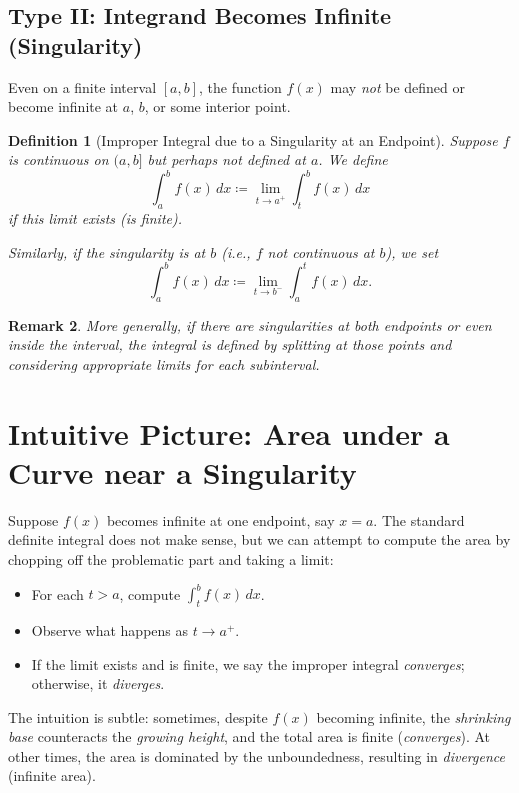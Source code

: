\documentclass[12pt]{article}
\newtheorem{definition}{Definition}[section]
\newtheorem{remark}[definition]{Remark}
\begin{document}
\subsection{Type II: Integrand Becomes Infinite (Singularity)}
Even on a finite interval $[a,b]$, the function $f(x)$ may \emph{not} be defined or become infinite at $a$, $b$, or some interior point.

\begin{definition}[Improper Integral due to a Singularity at an Endpoint]
Suppose $f$ is continuous on $(a,b]$ but perhaps not defined at $a$. We define
\[
\int_a^b f(x)\,dx \coloneqq \lim_{t\to a^+} \int_t^b f(x)\,dx
\]
if this limit exists (is finite).

Similarly, if the singularity is at $b$ (i.e., $f$ not continuous at $b$), we set
\[
\int_a^b f(x)\,dx \coloneqq \lim_{t\to b^-} \int_a^t f(x)\,dx.
\]
\end{definition}

\begin{remark}
More generally, if there are singularities at both endpoints or even inside the interval, the integral is defined by splitting at those points and considering appropriate limits for each subinterval.
\end{remark}

\section{Intuitive Picture: Area under a Curve near a Singularity}

Suppose $f(x)$ becomes infinite at one endpoint, say $x=a$. The standard definite integral does not make sense, but we can attempt to compute the area by chopping off the problematic part and taking a limit:

\begin{itemize}
    \item For each $t > a$, compute $\int_t^b f(x)\,dx$.
    \item Observe what happens as $t\to a^+$.
    \item If the limit exists and is finite, we say the improper integral \emph{converges}; otherwise, it \emph{diverges}.
\end{itemize}

The intuition is subtle: sometimes, despite $f(x)$ becoming infinite, the \emph{shrinking base} counteracts the \emph{growing height}, and the total area is finite (\emph{converges}). At other times, the area is dominated by the unboundedness, resulting in \emph{divergence} (infinite area).
\end{document}
